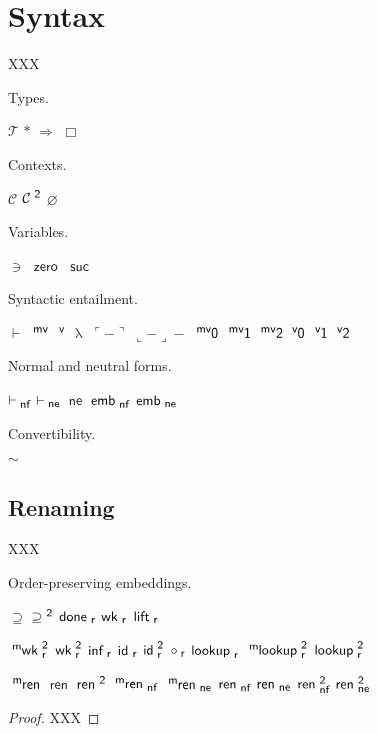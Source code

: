 \documentclass{entcs}
\newcommand{\ssZ}{\textsf{\small{2}}}
\newcommand{\ssm}{\textsf{\small{m}}}
\newcommand{\ssmv}{\textsf{\small{mv}}}
\newcommand{\ssv}{\textsf{\small{v}}}
\newcommand{\ssnf}{\textsf{\small{nf}}}
\newcommand{\ssne}{\textsf{\small{ne}}}
\newcommand{\ssr}{\textsf{\small{r}}}
\newcommand{\T}{\mathcal{T}}
\newcommand{\R}{\mathrel{\Rightarrow}}
\newcommand{\sq}{\mathop{\Box}}
\newcommand{\C}{\mathcal{C}}
\newcommand{\CZ}{\mathcal{C}^{\ssZ}}
\renewcommand{\O}{\varnothing}
\newcommand{\zero}{\operatorname{\textsf{zero}}}
\newcommand{\suc}{\operatorname{\textsf{suc}}}
\renewcommand{\e}{\mathrel{\vdash}}
\newcommand{\mvar}{\operatorname{^{\ssmv}}}
\newcommand{\var}{\operatorname{^{\ssv}}}
\newcommand{\lam}{\operatorname{\lambda}}
\newcommand{\quo}[1]{\mathopen{\ulcorner}{#1}\mathclose{\urcorner}}
\newcommand{\unquo}[2]{\mathopen{\llcorner}{#1}\mathclose{\lrcorner}{#2}}
\newcommand{\mvO}{\operatorname{^{\ssmv\mkern-1mu}\textsf{0}}}
\newcommand{\mvI}{\operatorname{^{\ssmv\mkern-1mu}\textsf{1}}}
\newcommand{\mvZ}{\operatorname{^{\ssmv\mkern-1mu}\textsf{2}}}
\newcommand{\vO}{\operatorname{^{\ssv\mkern-1mu}\textsf{0}}}
\newcommand{\vI}{\operatorname{^{\ssv\mkern-1mu}\textsf{1}}}
\newcommand{\vZ}{\operatorname{^{\ssv\mkern-1mu}\textsf{2}}}
\newcommand{\enf}{\mathrel{\vdash_{\mkern-1mu\ssnf}}}
\newcommand{\ene}{\mathrel{\vdash_{\mkern-1mu\rlap{$\ssne$}\hphantom{\ssnf}}}}
\renewcommand{\ne}{\operatorname{\textsf{ne}}}
\newcommand{\embnf}{\operatorname{\textsf{emb}_{\ssnf}}}
\newcommand{\embne}{\operatorname{\textsf{emb}_{\ssne}}}
\renewcommand{\geq}{\mathrel{\supseteq}}
\newcommand{\geqZ}{\mathrel{\supseteq^{\ssZ}}}
\newcommand{\doner}{\operatorname{\textsf{done}_{\ssr}}}
\newcommand{\wkr}{\operatorname{\textsf{wk}_{\ssr}}}
\newcommand{\liftr}{\operatorname{\textsf{lift}_{\ssr}}}
\newcommand{\mwkrZ}{\operatorname{^{\ssm\mkern-1mu}\textsf{wk}_{\ssr}^{\ssZ}}}
\newcommand{\wkrZ}{\operatorname{\textsf{wk}_{\ssr}^{\ssZ}}}
\newcommand{\infr}{\operatorname{\textsf{inf}_{\ssr}}}
\newcommand{\idr}{\operatorname{\textsf{id}_{\ssr}}}
\newcommand{\idrZ}{\operatorname{\textsf{id}_{\ssr}^{\ssZ}}}
\newcommand{\Or}{\mathbin{\circ_{\mkern-1mu\ssr}}}
\newcommand{\lookupr}{\operatorname{\textsf{lookup}_{\ssr}}}
\newcommand{\mlookuprZ}{\operatorname{^{\ssm\mkern-1mu}\textsf{lookup}_{\ssr}^{\ssZ}}}
\newcommand{\lookuprZ}{\operatorname{\textsf{lookup}_{\ssr}^{\ssZ}}}
\newcommand{\mren}{\operatorname{^{\ssm\mkern-1mu}\textsf{ren}}}
\newcommand{\ren}{\operatorname{\textsf{ren}}}
\newcommand{\renZ}{\operatorname{\textsf{ren}^{\ssZ}}}
\newcommand{\mrennf}{\operatorname{^{\ssm\mkern-1mu}\textsf{ren}_{\ssnf}}}
\newcommand{\mrenne}{\operatorname{^{\ssm\mkern-1mu}\textsf{ren}_{\ssne}}}
\newcommand{\rennf}{\operatorname{\textsf{ren}_{\ssnf}}}
\newcommand{\renne}{\operatorname{\textsf{ren}_{\ssne}}}
\newcommand{\rennfZ}{\operatorname{\textsf{ren}_{\ssnf}^{\ssZ}}}
\newcommand{\renneZ}{\operatorname{\textsf{ren}_{\ssne}^{\ssZ}}}
\begin{document}
\section{Syntax}
XXX


\begin{definition}
  Types.
  
$\T$ $\ast$ $\R$ $\sq$
\end{definition}


\begin{definition}
  Contexts.
  
$\C$ $\CZ$ $\O$
\end{definition}


\begin{definition}
  Variables.
  
$\ni$ $\zero$ $\suc$
\end{definition}


\begin{definition}
  Syntactic entailment.
  
$\e$ $\mvar$ $\var$ $\lam$ $\quo{-}$ $\unquo{-}{-}$ $\mvO$ $\mvI$ $\mvZ$ $\vO$ $\vI$ $\vZ$
\end{definition}


\begin{definition}
  Normal and neutral forms.
  
$\enf$ $\ene$ $\ne$ $\embnf$ $\embne$
\end{definition}


\begin{definition}
  Convertibility.
  
$\sim$
\end{definition}




\subsection*{Renaming}
XXX


\begin{definition}
  Order-preserving embeddings.
  
$\geq$ $\geqZ$ $\doner$ $\wkr$ $\liftr$
\end{definition}


$\mwkrZ$ $\wkrZ$ $\infr$ $\idr$ $\idrZ$ $\Or$ $\lookupr$ $\mlookuprZ$ $\lookuprZ$


\begin{lemma}[Renaming]

\end{lemma}
$\mren$ $\ren$ $\renZ$ $\mrennf$ $\mrenne$ $\rennf$ $\renne$ $\rennfZ$ $\renneZ$
\begin{proof}
  XXX
\end{proof}
\end{document}
